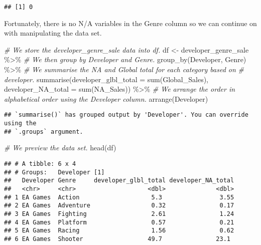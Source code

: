 \documentclass[
]{article}
\newenvironment{Shaded}{\begin{snugshade}}{\end{snugshade}}
\newcommand{\AttributeTok}[1]{\textcolor[rgb]{0.77,0.63,0.00}{#1}}
\newcommand{\CommentTok}[1]{\textcolor[rgb]{0.56,0.35,0.01}{\textit{#1}}}
\newcommand{\FunctionTok}[1]{\textcolor[rgb]{0.00,0.00,0.00}{#1}}
\newcommand{\NormalTok}[1]{#1}
\newcommand{\OtherTok}[1]{\textcolor[rgb]{0.56,0.35,0.01}{#1}}
\newcommand{\SpecialCharTok}[1]{\textcolor[rgb]{0.00,0.00,0.00}{#1}}
\begin{document}
\begin{verbatim}
## [1] 0
\end{verbatim}

Fortunately, there is no N/A variables in the Genre column so we can
continue on with manipulating the data set.

\begin{Shaded}
\begin{Highlighting}[]
\CommentTok{\# We store the developer\_genre\_sale data into df.}
\NormalTok{df }\OtherTok{\textless{}{-}}\NormalTok{ developer\_genre\_sale }\SpecialCharTok{\%\textgreater{}\%}
    \CommentTok{\# We then group by Developer and Genre.}
\FunctionTok{group\_by}\NormalTok{(Developer, Genre) }\SpecialCharTok{\%\textgreater{}\%}
    \CommentTok{\# We summarise the NA and Global total for each category based on}
    \CommentTok{\# developer.}
\FunctionTok{summarise}\NormalTok{(}\AttributeTok{developer\_glbl\_total =} \FunctionTok{sum}\NormalTok{(Global\_Sales), }\AttributeTok{developer\_NA\_total =} \FunctionTok{sum}\NormalTok{(NA\_Sales)) }\SpecialCharTok{\%\textgreater{}\%}
    \CommentTok{\# We arrange the order in alphabetical order using the Developer column.}
\FunctionTok{arrange}\NormalTok{(Developer)}
\end{Highlighting}
\end{Shaded}

\begin{verbatim}
## `summarise()` has grouped output by 'Developer'. You can override using the
## `.groups` argument.
\end{verbatim}

\begin{Shaded}
\begin{Highlighting}[]
\CommentTok{\# We preview the data set.}
\FunctionTok{head}\NormalTok{(df)}
\end{Highlighting}
\end{Shaded}

\begin{verbatim}
## # A tibble: 6 x 4
## # Groups:   Developer [1]
##   Developer Genre     developer_glbl_total developer_NA_total
##   <chr>     <chr>                    <dbl>              <dbl>
## 1 EA Games  Action                    5.3                3.55
## 2 EA Games  Adventure                 0.32               0.17
## 3 EA Games  Fighting                  2.61               1.24
## 4 EA Games  Platform                  0.57               0.21
## 5 EA Games  Racing                    1.56               0.62
## 6 EA Games  Shooter                  49.7               23.1
\end{verbatim}
\end{document}
